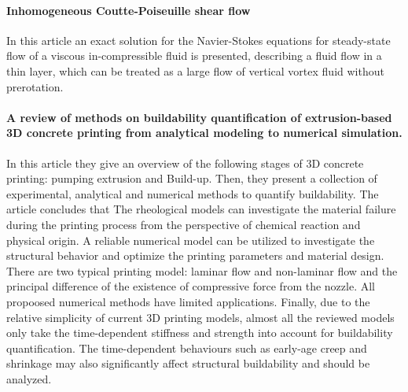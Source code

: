 \documentclass[main.tex]{subfiles}
\begin{document}
\paragraph{Inhomogeneous Coutte-Poiseuille shear flow}\cite{gorulevaInhomogeneousCouettePoiseuille2022}
In this article an exact solution for the Navier-Stokes equations for steady-state flow of a viscous in-compressible fluid is presented, describing a fluid flow in a thin layer, which can be treated as a large flow of vertical vortex fluid without prerotation.

\paragraph{A review of methods on buildability quantification of extrusion-based 3D concrete printing from analytical modeling to numerical simulation.}\cite{changReviewMethodsBuildability2023}
In this article they give an overview of the following stages of 3D concrete printing: pumping extrusion and Build-up.
Then, they present a collection of experimental, analytical and numerical methods to quantify buildability.
The article concludes that 
The rheological models can investigate the material failure during the printing process from the perspective of chemical reaction and physical origin.
A reliable numerical model can be utilized to investigate the structural behavior and optimize the printing parameters and material design.
There are two typical printing model: laminar flow and non-laminar flow and the principal difference of the existence of compressive force from the nozzle.
All propoosed numerical methods have limited applications.
Finally, due to the relative simplicity of current 3D printing models, almost all the reviewed models only take the time-dependent stiffness and strength into account for buildability quantification. 
The time-dependent behaviours such as early-age creep and shrinkage may also significantly affect structural buildability and should be analyzed.
\end{document}
